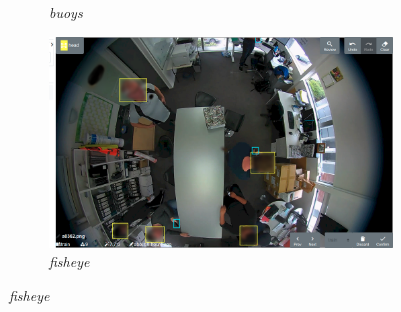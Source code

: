 \begin{figure}[h!]
\begin{subfigure}[t]{0.24\linewidth}
   \caption{\emph{buoys}}
 \end{subfigure}
\begin{subfigure}[t]{0.24\linewidth}
  \includegraphics[width=1.0\linewidth]{figures/annotation/screenshots/victor.png}
  \caption{\emph{fisheye}}
\end{subfigure}%


\end{figure}
